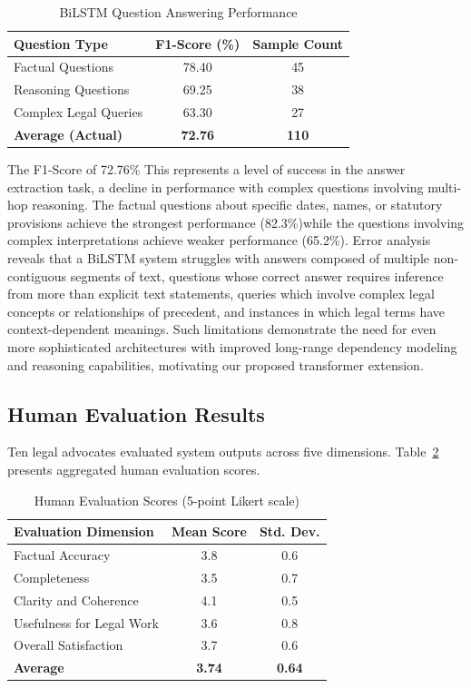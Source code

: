 \documentclass{llncs}
\begin{document}
\begin{table}[ht]
\centering
\caption{BiLSTM Question Answering Performance}
\label{tab:qa_results}
\begin{tabular}{@{}lcc@{}}
\toprule
\textbf{Question Type} & \textbf{F1-Score (\%)} & \textbf{Sample Count} \\
\midrule
Factual Questions     & 78.40 & 45 \\
Reasoning Questions   & 69.25 & 38 \\
Complex Legal Queries & 63.30 & 27 \\
\midrule
\textbf{Average (Actual)} & \textbf{72.76} & \textbf{110} \\
\bottomrule
\end{tabular}
\end{table}

The F1-Score of 72.76\% This represents a level of success in the answer extraction task, a decline in performance with complex questions involving multi-hop reasoning. The factual questions about specific dates, names, or statutory provisions achieve the strongest performance (82.3\%)while the questions involving complex interpretations achieve weaker performance (65.2\%). Error analysis reveals that a BiLSTM system struggles with answers composed of multiple non-contiguous segments of text, questions whose correct answer requires inference from more than explicit text statements, queries which involve complex legal concepts or relationships of precedent, and instances in which legal terms have context-dependent meanings. Such limitations demonstrate the need for even more sophisticated architectures with improved long-range dependency modeling and reasoning capabilities, motivating our proposed transformer extension.
\subsection{Human Evaluation Results}

Ten legal advocates evaluated system outputs across five dimensions. Table~\ref{tab:human_eval} presents aggregated human evaluation scores.

\begin{table}[ht]
\centering
\caption{Human Evaluation Scores (5-point Likert scale)}
\label{tab:human_eval}
\begin{tabular}{@{}lcc@{}}
\toprule
\textbf{Evaluation Dimension} & \textbf{Mean Score} & \textbf{Std. Dev.} \\
\midrule
Factual Accuracy & 3.8 & 0.6 \\
Completeness & 3.5 & 0.7 \\
Clarity and Coherence & 4.1 & 0.5 \\
Usefulness for Legal Work & 3.6 & 0.8 \\
Overall Satisfaction & 3.7 & 0.6 \\
\midrule
\textbf{Average} & \textbf{3.74} & \textbf{0.64} \\
\bottomrule
\end{tabular}
\end{table}
\end{document}
